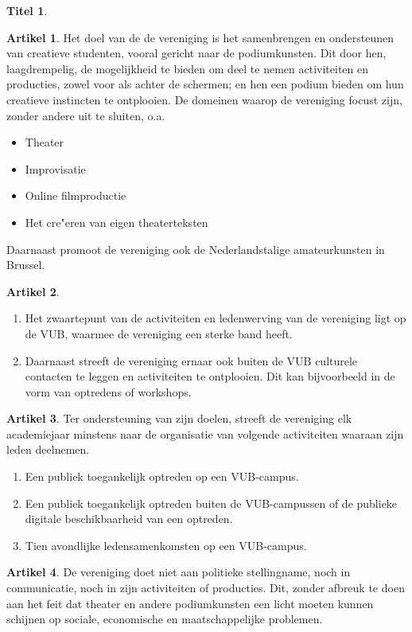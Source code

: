 \documentclass[a4paper,10pt]{article}
\theoremstyle{definition}
\newtheorem{titel}{\newline\Large Titel}
\newtheorem{artikel}{\large Artikel}
\newcommand{\ttextcr}{\hfill\newline}
\newcommand{\ttextenum}{\mbox{}}
\begin{document}
\begin{titel}
  \begin{artikel}\ttextcr
        Het doel van de de vereniging is het samenbrengen en ondersteunen van creatieve studenten, vooral gericht naar de podiumkunsten.
        Dit door hen, laagdrempelig, de mogelijkheid te bieden om deel te nemen activiteiten en producties, zowel voor als achter de schermen; en hen een podium bieden om hun creatieve instincten te ontplooien.
        De domeinen waarop de vereniging focust zijn, zonder andere uit te sluiten, o.a.
        \begin{itemize}
          \item Theater
          \item Improvisatie
          \item Online filmproductie
          \item Het cre"eren van eigen theaterteksten
        \end{itemize}
        Daarnaast promoot de vereniging ook de Nederlandstalige amateurkunsten in Brussel.
  \end{artikel}

  \begin{artikel}\ttextenum
    \begin{enumerate}
      \item Het zwaartepunt van de activiteiten en ledenwerving van de vereniging ligt op de VUB, waarmee de vereniging een sterke band heeft.
      \item
        Daarnaast streeft de vereniging ernaar ook buiten de VUB culturele contacten te leggen en activiteiten te ontplooien.
        Dit kan bijvoorbeeld in de vorm van optredens of workshops.
    \end{enumerate}
  \end{artikel}

  \begin{artikel}\ttextcr
    Ter ondersteuning van zijn doelen, streeft de vereniging elk academiejaar minstens naar de organisatie van volgende activiteiten waaraan zijn leden deelnemen.
    \begin{enumerate}
      \item Een publiek toegankelijk optreden op een VUB-campus.
      \item Een publiek toegankelijk optreden buiten de VUB-campussen of de publieke digitale beschikbaarheid van een optreden.
      \item Tien avondlijke ledensamenkomsten op een VUB-campus.
    \end{enumerate}
  \end{artikel}

  \begin{artikel}\ttextcr
    De vereniging doet niet aan politieke stellingname, noch in communicatie, noch in zijn activiteiten of producties.
    Dit, zonder afbreuk te doen aan het feit dat theater en andere podiumkunsten een licht moeten kunnen schijnen op sociale, economische en maatschappelijke problemen.
  \end{artikel}

\end{titel}
\end{document}
